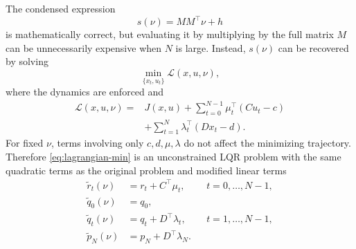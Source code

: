 \documentclass[11pt]{article}
\begin{document}
The condensed expression
\[
s(\nu)=MM^\top\nu+h
\]
is mathematically correct, but evaluating it by multiplying by the
full matrix \(M\) can be unnecessarily expensive when \(N\) is large.
Instead, \(s(\nu)\) can be recovered by solving
\begin{equation}
\min_{\{x_t,u_t\}}
\mathcal L(x,u,\nu),
\label{eq:lagrangian-min}
\end{equation}
where the dynamics are enforced and
\begin{equation}
\begin{aligned}
\mathcal L(x,u,\nu)
={}&J(x,u)
+\sum_{t=0}^{N-1}\mu_t^\top(Cu_t-c)\\
&+\sum_{t=1}^{N}\lambda_t^\top(Dx_t-d).
\end{aligned}
\label{eq:ocp-lagrangian}
\end{equation}
For fixed \(\nu\), terms involving only \(c,d,\mu,\lambda\) do not
affect the minimizing trajectory. Therefore
\eqref{eq:lagrangian-min} is an unconstrained LQR problem with the
same quadratic terms as the original problem and modified linear
terms
\begin{equation}
\begin{aligned}
\widetilde r_t(\nu)
&=r_t+C^\top\mu_t,
&&t=0,\ldots,N-1,\\
\widetilde q_0(\nu)
&=q_0,\\
\widetilde q_t(\nu)
&=q_t+D^\top\lambda_t,
&&t=1,\ldots,N-1,\\
\widetilde p_N(\nu)
&=p_N+D^\top\lambda_N.
\end{aligned}
\label{eq:modified-linear-terms}
\end{equation}
\end{document}
